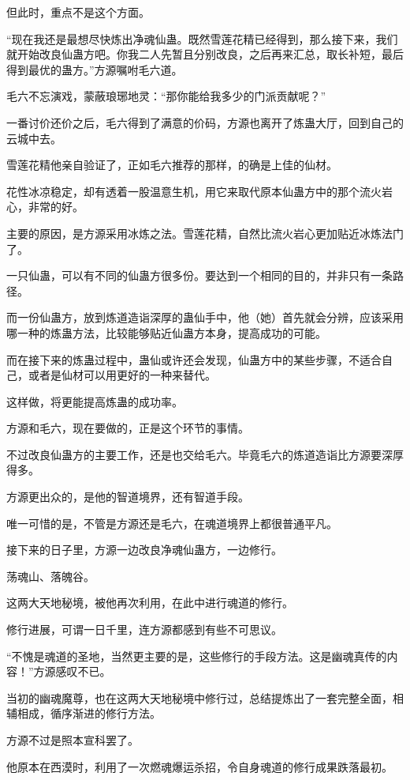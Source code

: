 \begin{this_body}
但此时，重点不是这个方面。

“现在我还是最想尽快炼出净魂仙蛊。既然雪莲花精已经得到，那么接下来，我们就开始改良仙蛊方吧。你我二人先暂且分别改良，之后再来汇总，取长补短，最后得到最优的蛊方。”方源嘱咐毛六道。

毛六不忘演戏，蒙蔽琅琊地灵：“那你能给我多少的门派贡献呢？”

一番讨价还价之后，毛六得到了满意的价码，方源也离开了炼蛊大厅，回到自己的云城中去。

雪莲花精他亲自验证了，正如毛六推荐的那样，的确是上佳的仙材。

花性冰凉稳定，却有透着一股温意生机，用它来取代原本仙蛊方中的那个流火岩心，非常的好。

主要的原因，是方源采用冰炼之法。雪莲花精，自然比流火岩心更加贴近冰炼法门了。

一只仙蛊，可以有不同的仙蛊方很多份。要达到一个相同的目的，并非只有一条路径。

而一份仙蛊方，放到炼道造诣深厚的蛊仙手中，他（她）首先就会分辨，应该采用哪一种的炼蛊方法，比较能够贴近仙蛊方本身，提高成功的可能。

而在接下来的炼蛊过程中，蛊仙或许还会发现，仙蛊方中的某些步骤，不适合自己，或者是仙材可以用更好的一种来替代。

这样做，将更能提高炼蛊的成功率。

方源和毛六，现在要做的，正是这个环节的事情。

不过改良仙蛊方的主要工作，还是也交给毛六。毕竟毛六的炼道造诣比方源要深厚得多。

方源更出众的，是他的智道境界，还有智道手段。

唯一可惜的是，不管是方源还是毛六，在魂道境界上都很普通平凡。

接下来的日子里，方源一边改良净魂仙蛊方，一边修行。

荡魂山、落魄谷。

这两大天地秘境，被他再次利用，在此中进行魂道的修行。

修行进展，可谓一日千里，连方源都感到有些不可思议。

“不愧是魂道的圣地，当然更主要的是，这些修行的手段方法。这是幽魂真传的内容！”方源感叹不已。

当初的幽魂魔尊，也在这两大天地秘境中修行过，总结提炼出了一套完整全面，相辅相成，循序渐进的修行方法。

方源不过是照本宣科罢了。

他原本在西漠时，利用了一次燃魂爆运杀招，令自身魂道的修行成果跌落最初。


\end{this_body}
